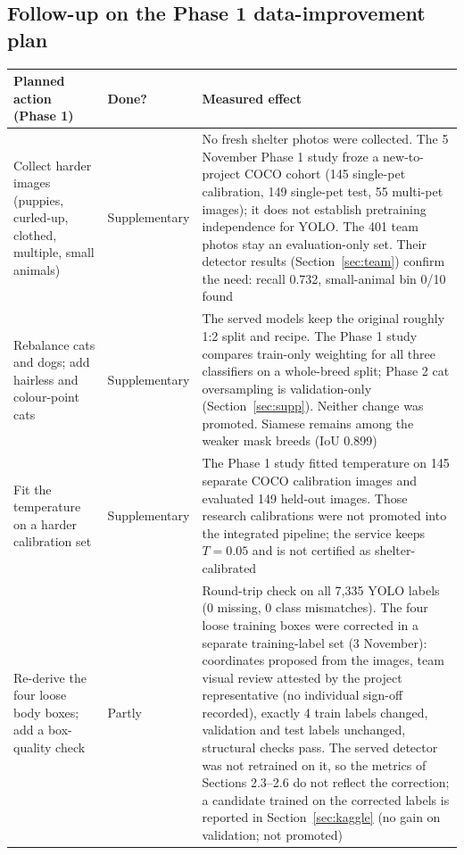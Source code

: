 \documentclass[11pt,a4paper]{article}
\begin{document}
\subsection*{Follow-up on the Phase 1 data-improvement plan}

{\small
\begin{tabularx}{\linewidth}{@{}Y l Y@{}}
\toprule
Planned action (Phase 1) & Done? & Measured effect \\
\midrule
Collect harder images (puppies, curled-up, clothed, multiple, small animals) & Supplementary & No fresh shelter photos were collected. The 5 November Phase 1 study froze a new-to-project COCO cohort (145 single-pet calibration, 149 single-pet test, 55 multi-pet images); it does not establish pretraining independence for YOLO. The 401 team photos stay an evaluation-only set. Their detector results (Section~\ref{sec:team}) confirm the need: recall 0.732, small-animal bin 0/10 found \\
Rebalance cats and dogs; add hairless and colour-point cats & Supplementary & The served models keep the original roughly 1:2 split and recipe. The Phase 1 study compares train-only weighting for all three classifiers on a whole-breed split; Phase 2 cat oversampling is validation-only (Section~\ref{sec:supp}). Neither change was promoted. Siamese remains among the weaker mask breeds (IoU 0.899) \\
Fit the temperature on a harder calibration set & Supplementary & The Phase 1 study fitted temperature on 145 separate COCO calibration images and evaluated 149 held-out images. Those research calibrations were not promoted into the integrated pipeline; the service keeps $T=0.05$ and is not certified as shelter-calibrated \\
Re-derive the four loose body boxes; add a box-quality check & Partly & Round-trip check on all 7,335 YOLO labels (0 missing, 0 class mismatches). The four loose training boxes were corrected in a separate training-label set (3 November): coordinates proposed from the images, team visual review attested by the project representative (no individual sign-off recorded), exactly 4 train labels changed, validation and test labels unchanged, structural checks pass. The served detector was not retrained on it, so the metrics of Sections 2.3--2.6 do not reflect the correction; a candidate trained on the corrected labels is reported in Section~\ref{sec:kaggle} (no gain on validation; not promoted) \\
\bottomrule
\end{tabularx}}
\end{document}
